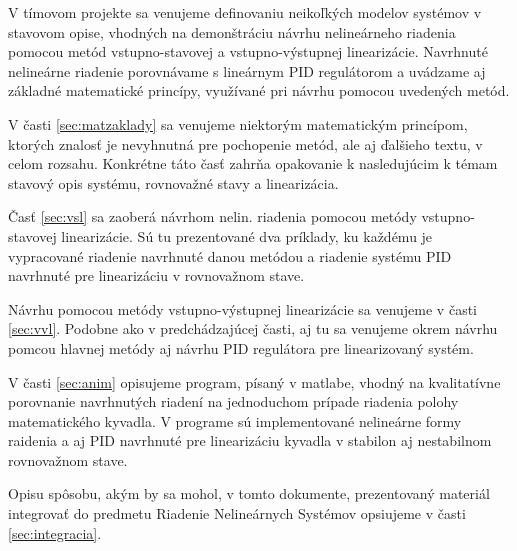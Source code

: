 \documentclass[../main.tex]{subfiles}
\begin{document}
    V tímovom projekte sa venujeme definovaniu neikoľkých modelov systémov v stavovom opise, vhodných na demonštráciu návrhu nelineárneho riadenia pomocou metód vstupno-stavovej a vstupno-výstupnej linearizácie. Navrhnuté nelineárne riadenie porovnávame s lineárnym PID regulátorom a uvádzame aj základné matematické princípy, využívané pri návrhu pomocou uvedených metód.

    V časti \ref{sec:matzaklady} sa venujeme niektorým matematickým princípom, ktorých znalosť je nevyhnutná pre pochopenie metód, ale aj ďalšieho textu, v celom rozsahu. Konkrétne táto časť zahrňa opakovanie k nasledujúcim k témam stavový opis systému, rovnovažné stavy a linearizácia. 
    
    Časť \ref{sec:vsl} sa zaoberá návrhom nelin. riadenia pomocou metódy vstupno-stavovej linearizácie. Sú tu prezentované dva príklady, ku každému je vypracované riadenie navrhnuté danou metódou a riadenie systému PID navrhnuté pre linearizáciu v rovnovažnom stave.

    Návrhu pomocou metódy vstupno-výstupnej linearizácie sa venujeme v časti \ref{sec:vvl}. Podobne ako v predchádzajúcej časti, aj tu sa venujeme okrem návrhu pomcou hlavnej metódy aj návrhu PID regulátora pre linearizovaný systém.

    V časti \ref{sec:anim} opisujeme program, písaný v matlabe, vhodný na kvalitatívne porovnanie navrhnutých riadení na jednoduchom prípade riadenia polohy matematického kyvadla. V programe sú implementované nelineárne formy raidenia a aj PID navrhnuté pre linearizáciu kyvadla v stabilon aj nestabilnom rovnovažnom stave.

    Opisu spôsobu, akým by sa mohol, v tomto dokumente, prezentovaný materiál integrovať do predmetu Riadenie Nelineárnych Systémov opsiujeme v časti \ref{sec:integracia}.
\end{document}

